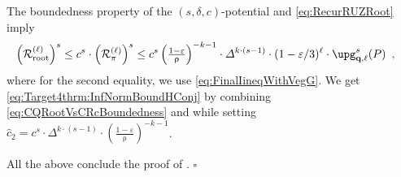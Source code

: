 \documentclass[11pt,reqno]{amsart}
\numberwithin{equation}{section}
\newcommand{\applegreen}[1]{ {\color{applegreen}#1}}
\newcommand{\bluepigment}[1]{{\color{blue(pigment)}#1}}
\newcommand{\darkmagenta}[1]{{\color{darkmagenta}#1}}
\newcommand{\goldenbrown}[1]{{\color{goldenbrown}#1}}
\newcommand{\maxDeg}{{\Delta}}
\newcommand{\pfs}{\darkmagenta{s}}
\renewcommand{\applegreen}[1]{#1}
\renewcommand{\bluepigment}[1]{#1}
\renewcommand{\darkmagenta}[1]{#1}
\renewcommand{\goldenbrown}[1]{#1}
\newcommand{\kk}{\bluepigment{k}}
\newcommand{\kell}{{\color{green(pigment)}\ell}}%
\newcommand{\kP}{\goldenbrown{P}}
\renewcommand{\kk}{k}
\renewcommand{\kell}{\ell}
\renewcommand{\kP}{P}
\newcommand{\SingBound}{\uprho}
\begin{document}
The boundedness property of the $(\pfs,\delta,c)$-potential and \eqref{eq:RecurRUZRoot} imply 
\begin{align}\label{eq:CQRootVsCRcBoundedness}
\left( \subcont_{\rm root}\right)^{\pfs} &\leq c^{\pfs} \cdot \left( \subcont_{\pi}\right)^{\pfs} 
% 
\leq c^{\pfs} \left( {\textstyle \frac{1-\varepsilon}{\SingBound} }\right)^{-\kk-1 } \cdot \maxDeg^{\kk\cdot(\pfs-1)} \cdot (1-\varepsilon/3)^{\kell}\cdot \vecG^{\pfs}_{\vtest, \kell}(\kP)\enspace, 
\end{align}
where for the second equality, we use \eqref{eq:FinalIineqWithVegG}. 
%
We get \eqref{eq:Target4thrm:InfNormBoundHConj} by combining \eqref{eq:CQRootVsCRcBoundedness}
and  while setting  
$\widehat{c}_2=c^{\pfs}\cdot \maxDeg^{\kk\cdot(\pfs-1)}\cdot \left( {\textstyle \frac{1-\varepsilon}{\SingBound} }\right)^{-\kk-1}$.



% 
All the above conclude the proof of .
\hfill $\square$
\end{document}

